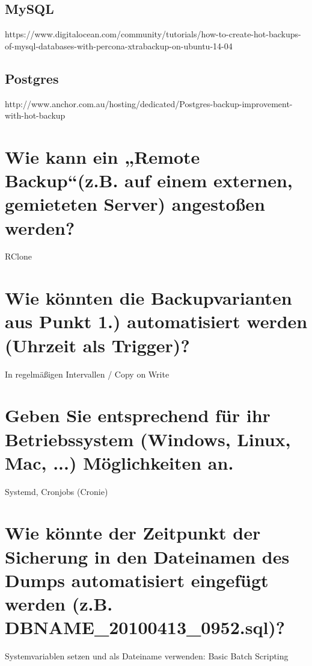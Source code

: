 \documentclass{school}
\begin{document}
\subsection{MySQL}
https://www.digitalocean.com/community/tutorials/how-to-create-hot-backups-of-mysql-databases-with-percona-xtrabackup-on-ubuntu-14-04

\subsection{Postgres}
http://www.anchor.com.au/hosting/dedicated/Postgres-backup-improvement-with-hot-backup

\section{Wie kann ein „Remote Backup“(z.B. auf einem externen, gemieteten Server) angestoßen werden?}
RClone

\section{Wie könnten die Backupvarianten aus Punkt 1.) automatisiert werden (Uhrzeit als Trigger)?}
In regelmäßigen Intervallen / Copy on Write

\section{Geben Sie entsprechend für ihr Betriebssystem (Windows, Linux, Mac, ...) Möglichkeiten an.}
Systemd, Cronjobs (Cronie)

\section{Wie könnte der Zeitpunkt der Sicherung in den Dateinamen des Dumps automatisiert eingefügt werden (z.B. DBNAME\_20100413\_0952.sql)?}
Systemvariablen setzen und als Dateiname verwenden: Basic Batch Scripting
\end{document}
